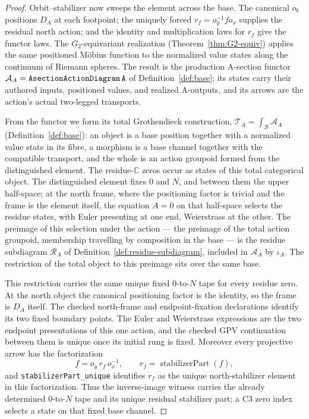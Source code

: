 \documentclass[11pt]{article}
\newcommand{\CC}{\mathbb{C}}
\theoremstyle{plain}
\theoremstyle{definition}
\theoremstyle{remark}
\begin{document}
\begin{proof}
Orbit--stabilizer now sweeps the element across the base. The canonical $o_b$ positions $D_A$ at
each footpoint; the uniquely forced $r_f=o_y^{-1}fo_x$ supplies the residual north action; and the
identity and multiplication laws for $r_f$ give the functor laws. The $G_2$-equivariant realization
\textup{(}Theorem~\ref{thm:G2-equiv}\textup{)} applies the same positioned M\"obius function to
the normalized value states along the continuum of Riemann spheres. The result is the production
A-section functor $\mathcal A_A=\texttt{AsectionActionDiagram\,A}$ of
Definition~\ref{def:base}; its states carry their authored inputs, positioned values, and realized
A-outputs, and its arrows are the action's actual two-legged transports.

From the functor we form its total Grothendieck construction,
$\mathcal T_A=\int_{\mathcal B}\mathcal A_A$ \textup{(}Definition~\ref{def:base}\textup{)}: an
object is a base position together with a normalized value state in its fibre, a morphism is a
base channel together with the compatible transport, and the whole is an action groupoid
formed from the distinguished element. The residue-$\CC$ zeros occur as states of this total
categorical object. The distinguished element fixes $0$ and $N$, and between them
the upper half-space; at the north frame, where the positioning factor is trivial and the
frame is the element itself, the equation $A=0$ on that half-space selects the residue states,
with Euler presenting at one end, Weierstrass at the other. The preimage of this selection
under the action --- the preimage of the total action groupoid, membership travelling by
composition in the base --- is the residue subdiagram $\mathcal R_A$ of
Definition~\ref{def:residue-subdiagram}, included in $\mathcal A_A$ by $\iota_A$. The
restriction of the total object to this preimage sits over the same base.

This restriction carries the same unique fixed $0$-to-$N$ tape for every residue zero. At the
north object the canonical positioning factor is the identity, so the frame is $D_A$ itself. The
checked north-frame and endpoint-fixation declarations identify its two fixed boundary points.
The Euler and Weierstrass expressions are the two endpoint presentations of this one action, and
the checked GPV continuation between them is unique once its initial rung is fixed. Moreover every
projective arrow has the factorization
\[
  f=o_y\,r_f\,o_x^{-1},
  \qquad r_f=\operatorname{stabilizerPart}(f),
\]
and \texttt{stabilizerPart\_unique} identifies $r_f$ as the unique north-stabilizer element in
this factorization. Thus the inverse-image witness carries the already determined $0$-to-$N$ tape
and its unique residual stabilizer part; a C3 zero index selects a state on that fixed base
channel.


\end{proof}
\end{document}
